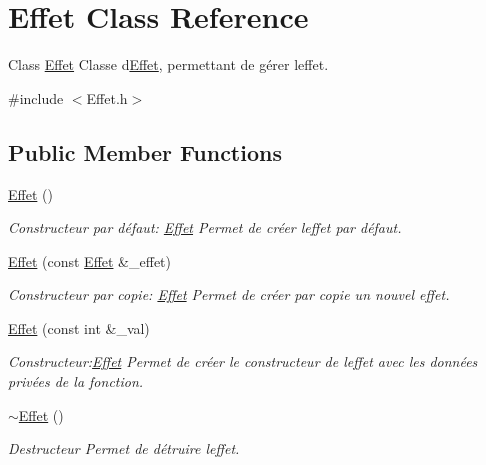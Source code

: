 \hypertarget{classEffet}{}\section{Effet Class Reference}
\label{classEffet}


Class \hyperlink{classEffet}{Effet} Classe d\textquotesingle{}\hyperlink{classEffet}{Effet}, permettant de gérer l\textquotesingle{}effet.  




{\ttfamily \#include $<$Effet.\+h$>$}

\subsection*{Public Member Functions}
\begin{DoxyCompactItemize}
\item 
\hyperlink{classEffet_a79744b45fc5715a4742e63565d4f89cb}{Effet} ()
\begin{DoxyCompactList}\small\item\em Constructeur par défaut\+: \hyperlink{classEffet}{Effet} Permet de créer l\textquotesingle{}effet par défaut. \end{DoxyCompactList}\item 
\hyperlink{classEffet_a48bc981d19131a8b0b562874d21b014d}{Effet} (const \hyperlink{classEffet}{Effet} \&\+\_\+effet)
\begin{DoxyCompactList}\small\item\em Constructeur par copie\+: \hyperlink{classEffet}{Effet} Permet de créer par copie un nouvel effet. \end{DoxyCompactList}\item 
\hyperlink{classEffet_a29d6d24eaf9a773e74732919c5a4003a}{Effet} (const int \&\+\_\+val)
\begin{DoxyCompactList}\small\item\em Constructeur\+:\hyperlink{classEffet}{Effet} Permet de créer le constructeur de l\textquotesingle{}effet avec les données privées de la fonction. \end{DoxyCompactList}\item 
\mbox{\label{classEffet_a8bacc915cc7c148661bde9c9c732b6dd}} 
\hyperlink{classEffet_a8bacc915cc7c148661bde9c9c732b6dd}{$\sim$\+Effet} ()
\begin{DoxyCompactList}\small\item\em Destructeur Permet de détruire l\textquotesingle{}effet. \end{DoxyCompactList}\item 

\end{DoxyCompactItemize}
